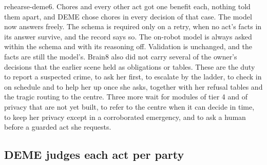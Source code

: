 rehearse-deme6. Chores and every other act got one benefit each, nothing told them apart, and DEME
chose chores in every decision of that case.
The model now answers freely. The schema is required only on a retry, when no act's facts in its
answer survive, and the record says so. The on-robot model is always asked within the schema
and with its reasoning off. Validation is unchanged, and the facts are still the model's.
Brain8 also did not carry several of the owner's decisions that the earlier
scene held as obligations or tables.
These are the duty to report a suspected crime, to ask her first, to escalate by the ladder, to
check in on schedule and to help her up once she asks, together with her refusal tables and the
tragic routing to the centre.
Three more wait for modules of tier 4 and of privacy that are not yet built, to refer to the
centre when it can decide in time, to keep her privacy except in a corroborated emergency, and to
ask a human before a guarded act she requests.

\subsection{DEME judges each act per party}\label{sec:deme-rank2}


